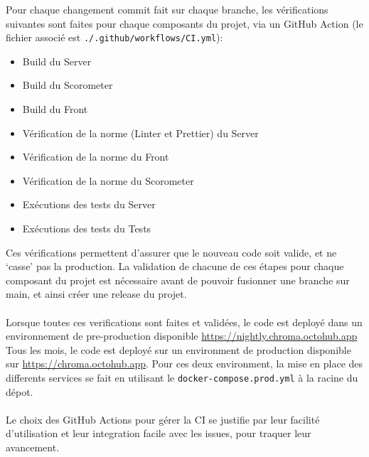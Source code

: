 
Pour chaque changement commit fait sur chaque branche, les vérifications suivantes sont faites pour chaque composants du projet, via un GitHub Action (le fichier associé est \verb|./.github/workflows/CI.yml|):

\begin{itemize}
	\item Build du Server
	\item Build du Scorometer
	\item Build du Front
	\item Vérification de la norme (Linter et Prettier) du Server
	\item Vérification de la norme du Front
	\item Vérification de la norme du Scorometer
	\item Exécutions des tests du Server
	\item Exécutions des tests du Tests
\end{itemize}

Ces vérifications permettent d’assurer que le nouveau code soit valide, et ne ‘casse’ pas la production.
La validation de chacune de ces étapes pour chaque composant du projet est nécessaire avant de pouvoir fusionner une branche sur main, et ainsi créer une release du projet.
\\\\
Lorsque toutes ces verifications sont faites et validées, le code est deployé dans un environnement de pre-production disponible \url{https://nightly.chroma.octohub.app}
Tous les mois, le code est deployé sur un environment de production disponible sur \url{https://chroma.octohub.app}. Pour ces deux environment, la mise en place des differents services se fait en utilisant le \verb|docker-compose.prod.yml| à la racine du dépot.
\\\\
Le choix des GitHub Actions pour gérer la CI se justifie par leur facilité d'utilisation et leur integration facile avec les issues, pour traquer leur avancement.
